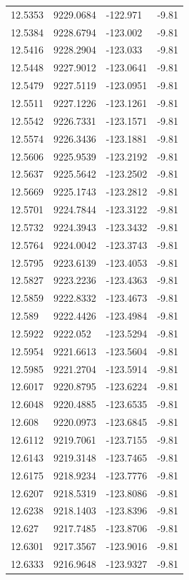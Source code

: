 \begin{table}[H]
\begin{tabular}{llll}
12.5353 & 9229.0684 & -122.971 & -9.81 \\
12.5384 & 9228.6794 & -123.002 & -9.81 \\
12.5416 & 9228.2904 & -123.033 & -9.81 \\
12.5448 & 9227.9012 & -123.0641 & -9.81 \\
12.5479 & 9227.5119 & -123.0951 & -9.81 \\
12.5511 & 9227.1226 & -123.1261 & -9.81 \\
12.5542 & 9226.7331 & -123.1571 & -9.81 \\
12.5574 & 9226.3436 & -123.1881 & -9.81 \\
12.5606 & 9225.9539 & -123.2192 & -9.81 \\
12.5637 & 9225.5642 & -123.2502 & -9.81 \\
12.5669 & 9225.1743 & -123.2812 & -9.81 \\
12.5701 & 9224.7844 & -123.3122 & -9.81 \\
12.5732 & 9224.3943 & -123.3432 & -9.81 \\
12.5764 & 9224.0042 & -123.3743 & -9.81 \\
12.5795 & 9223.6139 & -123.4053 & -9.81 \\
12.5827 & 9223.2236 & -123.4363 & -9.81 \\
12.5859 & 9222.8332 & -123.4673 & -9.81 \\
12.589 & 9222.4426 & -123.4984 & -9.81 \\
12.5922 & 9222.052 & -123.5294 & -9.81 \\
12.5954 & 9221.6613 & -123.5604 & -9.81 \\
12.5985 & 9221.2704 & -123.5914 & -9.81 \\
12.6017 & 9220.8795 & -123.6224 & -9.81 \\
12.6048 & 9220.4885 & -123.6535 & -9.81 \\
12.608 & 9220.0973 & -123.6845 & -9.81 \\
12.6112 & 9219.7061 & -123.7155 & -9.81 \\
12.6143 & 9219.3148 & -123.7465 & -9.81 \\
12.6175 & 9218.9234 & -123.7776 & -9.81 \\
12.6207 & 9218.5319 & -123.8086 & -9.81 \\
12.6238 & 9218.1403 & -123.8396 & -9.81 \\
12.627 & 9217.7485 & -123.8706 & -9.81 \\
12.6301 & 9217.3567 & -123.9016 & -9.81 \\
12.6333 & 9216.9648 & -123.9327 & -9.81 \\

\end{tabular}
\end{table}
